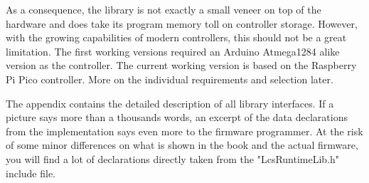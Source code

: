 As a consequence, the library is not exactly a small veneer on top of the hardware and does take its program memory toll on controller storage. However, with the growing capabilities of modern controllers, this should not be a great limitation. The first working versions required an Arduino Atmega1284 alike version as the controller. The current working version is based on the Raspberry Pi Pico controller. More on the individual requirements and selection later.

The appendix contains the detailed description of all library interfaces. If a picture says more than a thousands words, an excerpt of the data declarations from the implementation says even more to the firmware programmer. At the risk of some minor differences on what is shown in the book and the actual firmware, you will find a lot of declarations directly taken from the "LcsRuntimeLib.h" include file.
